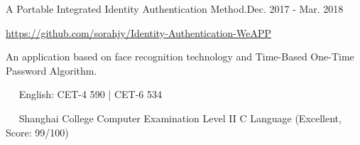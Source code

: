 \documentclass{sorahjy_cv}
\begin{document}
\begin{sectionContentSimple}{A Portable Integrated Identity Authentication Method.}{Dec. 2017 - Mar. 2018}
	\item \url{https://github.com/sorahjy/Identity-Authentication-WeAPP}
	\item An application based on face recognition technology and Time-Based One-Time Password Algorithm.
\end{sectionContentSimple}


%
%



%
%

\begin{description}{}
	\item{\ \ } English: CET-4 590 | CET-6 534
	\item{\ \ } Shanghai College Computer Examination Level II C Language (Excellent, Score: 99/100)
\end{description}





\end{document}
